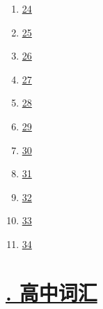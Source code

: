 \documentclass[11pt]{article}
\begin{document}
\begin{multicols}{6}
\begin{enumerate}
		\item \href{https://mp.weixin.qq.com/s/GvW0ZJwz76RVLGDd83oOSQ}{24}	%
		\item \href{https://mp.weixin.qq.com/s/xHUQytjvJBsn9QNPOuXq_w}{25}	%
		\item \href{https://mp.weixin.qq.com/s/niMVudrwjctvLq23cNwkPA}{26}	%
		\item \href{https://mp.weixin.qq.com/s/Y_UHMp06p7-kQDjK8AN0Zw}{27}	%
		\item \href{https://mp.weixin.qq.com/s/ot3M64ydWy-JjfIGJDCWBg}{28}	%
		\item \href{https://mp.weixin.qq.com/s/wBSuj7JiUvT5ya-kaFDs5A}{29}	%
		\item \href{https://mp.weixin.qq.com/s/lASBxE3EscG1Tqy9C8_J1w}{30}	%
		\item \href{https://mp.weixin.qq.com/s/js-rgBYovoOolvHWhnxIxA}{31}	%
		\item \href{https://mp.weixin.qq.com/s/Zwd6UfiPOyD8MIVcTwsOAg}{32}	%
		\item \href{https://mp.weixin.qq.com/s/jThzJDRI1ZH8XzPNNIVmsA}{33}	%
		\item \href{https://mp.weixin.qq.com/s/JJOeKI2d_CiawRcif7z3Tg}{34}	%
	\end{enumerate}
	
\end{multicols}


\vspace{-0.5cm}

\section*{\normalfont \large  \href{https://www.youtube.com/playlist?list=PLmbmjB9I926Yr_zch7Qwo7vltRyX2g6Eb}{. 高中词汇} }

\vspace{-0.5cm}
\end{document}
